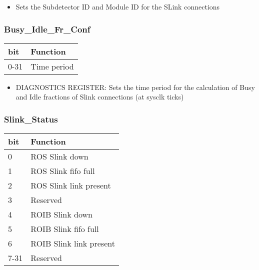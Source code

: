 \begin{itemize}
\item Sets the Subdetector ID and Module ID for the SLink connections
\end{itemize}




\subsubsection{Busy\_Idle\_Fr\_Conf}

\begin {table}[H]
\begin{center}
\begin{tabular}{|l|l|}
\hline
\textbf{bit} & \textbf{Function} \\
\hline
0-31 & Time period \\
\hline
\end{tabular}
\end{center}
\end{table}


\begin{itemize}
\item DIAGNOSTICS REGISTER: Sets the time period for the calculation of Busy and Idle fractions of Slink connections (at sysclk ticks)
\end{itemize}



\subsubsection{Slink\_Status}

\begin {table}[H]
\begin{center}
\begin{tabular}{|l|l|}
\hline
\textbf{bit} & \textbf{Function} \\
\hline
0 & ROS Slink down \\
\hline
1 & ROS Slink fifo full \\
\hline
2 & ROS Slink link present \\
\hline
3 & Reserved \\
\hline
4 & ROIB Slink down \\
\hline
5 & ROIB Slink fifo full \\
\hline
6 & ROIB Slink link present \\
\hline
7-31 & Reserved \\
\hline
\end{tabular}
\end{center}
\end{table}



